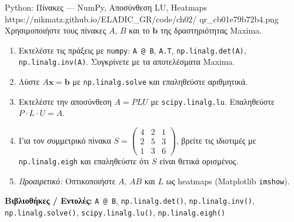 \begin{pybox}{Python: Πίνακες — NumPy, Αποσύνθεση LU, Heatmaps}%
             {https://nikmatz.github.io/ELADIC_GR/code/ch02/}%
             {qr_cb01e79b72b4.png}
\label{py:ch2_matrix_algebra}
Χρησιμοποιήστε τους πίνακες $A$, $B$ και το $\mathbf{b}$ της δραστηριότητας
Maxima.
\begin{enumerate}[label=(\alph*),itemsep=2pt]
  \item Εκτελέστε τις πράξεις με \texttt{numpy}: \texttt{A @ B},
    \texttt{A.T}, \texttt{np.linalg.det(A)}, \texttt{np.linalg.inv(A)}.
    Συγκρίνετε με τα αποτελέσματα Maxima.
  \item Λύστε $A\mathbf{x}=\mathbf{b}$ με \texttt{np.linalg.solve}
    και επαληθεύστε αριθμητικά.
  \item Εκτελέστε την αποσύνθεση $A = PLU$ με \texttt{scipy.linalg.lu}.
    Επαληθεύστε $P \cdot L \cdot U = A$.
  \item Για τον συμμετρικό πίνακα
    $S = \begin{pmatrix}4&2&1\\2&5&3\\1&3&6\end{pmatrix}$,
    βρείτε τις ιδιοτιμές με \texttt{np.linalg.eigh}
    και επαληθεύστε ότι $S$ είναι θετικά ορισμένος.
  \item \textit{Προαιρετικό:} Οπτικοποιήστε $A$, $AB$ και $L$ ως
    heatmaps (Matplotlib \texttt{imshow}).
\end{enumerate}
\medskip
\textbf{Βιβλιοθήκες / Εντολές:}
\texttt{A @ B}, \texttt{np.linalg.det()}, \texttt{np.linalg.inv()},
\texttt{np.linalg.solve()}, \texttt{scipy.linalg.lu()},
\texttt{np.linalg.eigh()}
\end{pybox}
